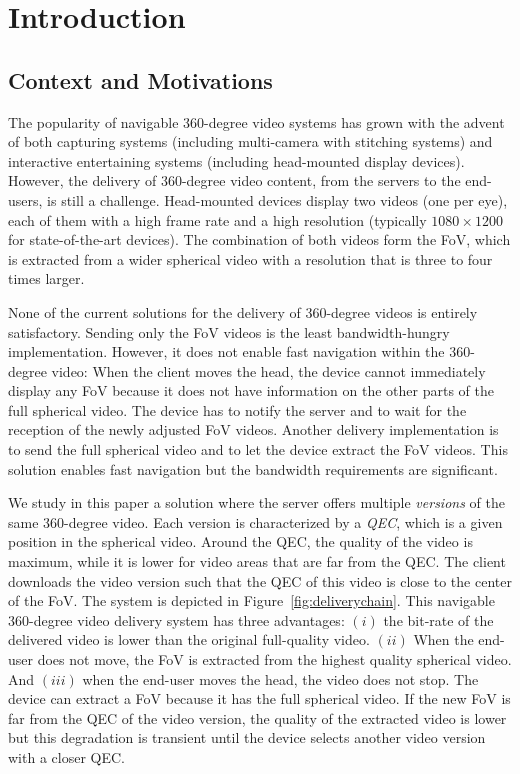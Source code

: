 \section{Introduction}
\label{sec:introduction}

\subsection{Context and Motivations}

The popularity of navigable 360-degree video systems 
has grown with the advent of both capturing systems
(including multi-camera with stitching systems) and interactive entertaining
systems (including head-mounted display devices).
However, the delivery of 360-degree video content, from the servers
to the end-users,
is still a challenge. Head-mounted devices display two videos (one per
eye), each of them with a high frame rate and a high resolution (typically 
$1080\times 1200$ for state-of-the-art devices). The combination of both videos
form the \ac{FoV}, which is extracted
from a wider spherical video with a resolution that is three to four times larger.

None of the current solutions for the delivery of 360-degree videos is entirely 
satisfactory. Sending only 
the \ac{FoV} videos is the least bandwidth-hungry implementation. However, it does 
not enable fast
navigation within the 360-degree video: When the client moves the head, the device cannot 
immediately display any \ac{FoV} because it does not have information on the other
parts of the full spherical video. The device has to notify the server and to wait 
for the reception of the 
newly adjusted \ac{FoV} videos. Another delivery implementation is to send the full spherical video 
and to let the device
extract the \ac{FoV} videos. This solution enables fast navigation but the bandwidth requirements are 
significant.

We study in this paper a solution where the server offers multiple \emph{versions} of the same 
360-degree video. Each version is characterized by a \emph{\ac{QEC}}, which is a given 
position in the spherical video. Around the \ac{QEC}, the quality of the video is maximum,
while it is lower for video areas that are far from the \ac{QEC}.
The client downloads the video version
such that  
the \ac{QEC} of this video is close to the center of the \ac{FoV}.
The system is depicted in Figure~\ref{fig:deliverychain}.
This navigable 360-degree video delivery system has three advantages:
$(i)$ the bit-rate of the delivered video is lower than the original full-quality video.
$(ii)$ When the end-user does not move, the \ac{FoV} is extracted from the highest 
quality spherical video.
And $(iii)$ when the end-user moves the head, the video does not stop. The device can 
extract 
a \ac{FoV} because it has the full spherical video. If the new \ac{FoV} is far from the 
\ac{QEC} of the video version, the quality of the extracted video is lower but this
degradation is transient until the 
device selects another video version with a closer \ac{QEC}.

